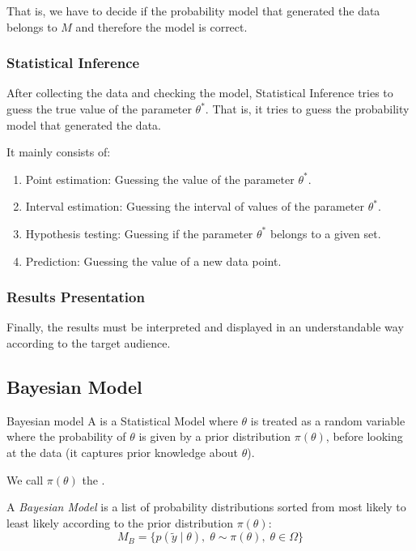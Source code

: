That is, we have to decide if the probability model that generated the data
belongs to $M$ and therefore the model is correct.

\subsubsection{Statistical Inference}

After collecting the data and checking the model, Statistical Inference
tries to guess the true value of the parameter $\theta^*$. That is, it tries
to guess the probability model that generated the data.

It mainly consists of:
\begin{enumerate}
	\item Point estimation: Guessing the value of the parameter $\theta^*$.
	\item Interval estimation: Guessing the interval of values of the parameter $\theta^*$.
	\item Hypothesis testing: Guessing if the parameter $\theta^*$ belongs to a given set.
	\item Prediction: Guessing the value of a new data point.
\end{enumerate}

\subsubsection{Results Presentation}

Finally, the results must be interpreted and displayed in an understandable way
according to the target audience.

\subsection{Bayesian Model}

\begin{definition}{Bayesian model}{}{}
	A  is a Statistical Model where $\theta$ is treated as a random variable
	where the probability of $\theta$ is given by a prior distribution $\pi(\theta)$,
	before looking at the data (it captures prior knowledge about $\theta$).

	We call $\pi(\theta)$ the .

	A \emph{Bayesian Model} is a list of probability distributions sorted from most
	likely to least likely according to the prior distribution $\pi(\theta)$:
	\begin{equation}
		M_B = \{ p(\tilde{y}\mid\theta), \; \theta \sim \pi(\theta), \; \theta \in \Omega \}
	\end{equation}
\end{definition}

